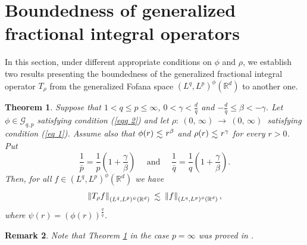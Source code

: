 \documentclass[a4paper,12pt,intlimits,oneside]{amsart}
\numberwithin{equation}{section}
\newtheorem{theorem}{Theorem}[section]
\newtheorem{remark}[theorem]{Remark}
\numberwithin{equation}{section}
\def\lsim{\raisebox{-1ex}{$~\stackrel{\textstyle <}{\sim}~$}}
\theoremstyle{definition}
\begin{document}
\section{Boundedness of generalized fractional integral operators}
\label{S4}
In this section, under different appropriate conditions on $\phi$ and $\rho$, we establish two results presenting the boundedness of the generalized fractional integral operator $T_{\rho}$ from the generalized Fofana space $(L^{q},L^{p})^{\phi}(\mathbb{R}^{d})$ to another one. 
\begin{theorem}\label{theo 3}
Suppose that $1 < q\leq p \leq \infty$, $ 0 < \gamma < \frac{d}{q}$ and $-\frac{d}{q} \leq \beta  < -\gamma $. Let $\phi\in \mathcal{G}_{q,p}$ satisfying condition (\ref{eqq 2}) and let $\rho : \: (0,\,\infty) \:  \to \: (0,\,\infty) \:$ satisfying condition (\ref{eq 1}). Assume also that 
$\phi(r) \lsim  r^{\beta}$ and $\rho(r) \lsim  r^{\gamma}$ for every $r > 0$. \\ Put $$\frac{1}{\bar{p}} = \frac{1}{p}\left(1 +\frac{\gamma}{\beta}\right) \quad \text{ and } \quad \frac{1}{\bar{q}} = \frac{1}{q}\left(1 +\frac{\gamma}{\beta}\right). $$
Then, for all  $f \in (L^{q},L^{p})^{\phi}(\mathbb{R}^{d})$ we have
 $$\left\Vert T_{\rho}f \right\Vert_{(L^{\bar{q}},L^{\bar{p}})^{\psi}(\mathbb{R}^{d})} \lsim  \left\Vert f  \right\Vert_{(L^{q},L^{p})^{\phi}(\mathbb{R}^{d})},$$ where  $\psi(r)= (\phi(r))^{\frac{q}{\bar{q}}}$.
\end{theorem}
\begin{remark}
Note that Theorem \ref{theo 3} in the case $p=\infty$ was proved in \cite[Theorem 2.3]{GE}. 
\end{remark}
\end{document}
